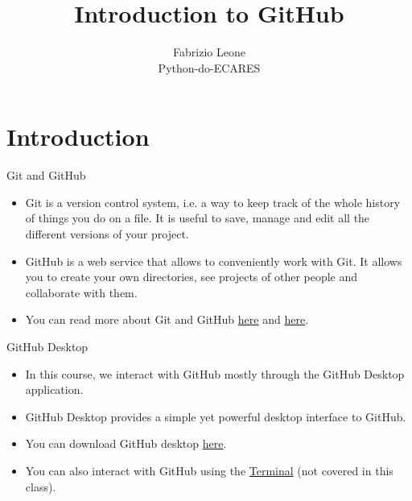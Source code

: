 \documentclass[aspectratio=169]{beamer}
\title{Introduction to GitHub}
\author{Fabrizio Leone \\ Python-do-ECARES}
\begin{document}
\begin{frame}[plain]
    \maketitle
\end{frame}

\section{Introduction}

\begin{frame}{Git and GitHub}

\begin{itemize}\setlength\itemsep{2.5em}
	\item Git is a version control system, i.e. a way to keep track of the whole history of things you do on a file. It is useful to save, manage and edit all the different versions of your project. 
	\item GitHub is a web service that allows to conveniently work with Git. It allows you to create your own directories, see projects of other people and collaborate with them. 
	\item You can read more about Git and GitHub \href{https://medium.com/@abhishekj/an-intro-to-git-and-github-1a0e2c7e3a2f}{here} and \href{https://medium.com/launch-school/understanding-git-and-github-8ac987877a5}{here}.
	
\end{itemize}

\end{frame}

\begin{frame}{GitHub Desktop}

\begin{itemize}\setlength\itemsep{2em}
		\item In this course, we interact with GitHub mostly through the GitHub Desktop application.
		\item GitHub Desktop provides a simple yet powerful desktop interface to GitHub.
		\item You can download GitHub desktop \href{https://desktop.github.com/}{here}. 
		\item You can also interact with GitHub using the \href{https://github.com/codepath/ios_guides/wiki/Using-Git-with-Terminal}{Terminal} (not covered in this class).
\end{itemize}	

\end{frame}
\end{document}
